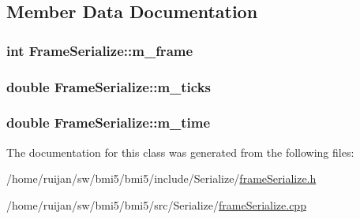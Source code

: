 \subsection{Member Data Documentation}
\hypertarget{classFrameSerialize_a6cf05a591ccdbea37fda4192e51b18cf}{
\subsubsection[{m\-\_\-frame}]{\setlength{\rightskip}{0pt plus 5cm}int Frame\-Serialize\-::m\-\_\-frame}}\label{classFrameSerialize_a6cf05a591ccdbea37fda4192e51b18cf}
\hypertarget{classFrameSerialize_a3299fc53239b5e9d4c1c6441be8c5a00}{
\subsubsection[{m\-\_\-ticks}]{\setlength{\rightskip}{0pt plus 5cm}double Frame\-Serialize\-::m\-\_\-ticks}}\label{classFrameSerialize_a3299fc53239b5e9d4c1c6441be8c5a00}
\hypertarget{classFrameSerialize_a0be80383beb183887e34850ef542be32}{
\subsubsection[{m\-\_\-time}]{\setlength{\rightskip}{0pt plus 5cm}double Frame\-Serialize\-::m\-\_\-time}}\label{classFrameSerialize_a0be80383beb183887e34850ef542be32}


The documentation for this class was generated from the following files\-:\begin{DoxyCompactItemize}
\item 
/home/ruijan/sw/bmi5/bmi5/include/\-Serialize/\hyperlink{frameSerialize_8h}{frame\-Serialize.\-h}\item 
/home/ruijan/sw/bmi5/bmi5/src/\-Serialize/\hyperlink{frameSerialize_8cpp}{frame\-Serialize.\-cpp}\end{DoxyCompactItemize}

